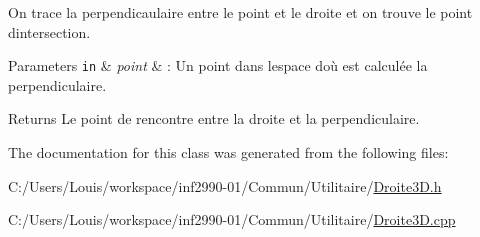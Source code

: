 On trace la perpendicaulaire entre le point et le droite et on trouve le point d\textquotesingle{}intersection.


\begin{DoxyParams}[1]{Parameters}
\mbox{\tt in}  & {\em point} & \+: Un point dans l\textquotesingle{}espace d\textquotesingle{}où est calculée la perpendiculaire.\\
\hline
\end{DoxyParams}
\begin{DoxyReturn}{Returns}
Le point de rencontre entre la droite et la perpendiculaire. 
\end{DoxyReturn}


The documentation for this class was generated from the following files\+:\begin{DoxyCompactItemize}
\item 
C\+:/\+Users/\+Louis/workspace/inf2990-\/01/\+Commun/\+Utilitaire/\hyperlink{_droite3_d_8h}{Droite3\+D.\+h}\item 
C\+:/\+Users/\+Louis/workspace/inf2990-\/01/\+Commun/\+Utilitaire/\hyperlink{_droite3_d_8cpp}{Droite3\+D.\+cpp}\end{DoxyCompactItemize}
